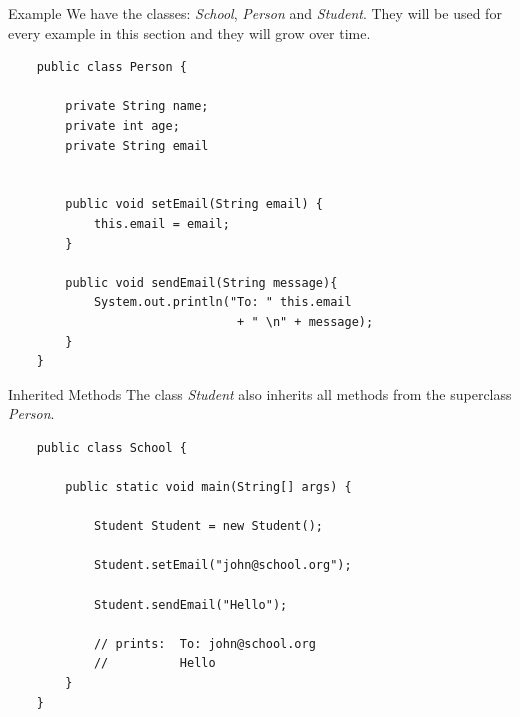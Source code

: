 \begin{frame}[fragile]{Example}
	We have the classes: \emph{School}, \emph{Person} and \emph{Student}.
	They will be used for every example in this section and they will grow over time.
	\begin{lstlisting}
	public class Person {
	
	    private String name;
	    private int age;
	    private String email
	    
    
	    public void setEmail(String email) {
	    	this.email = email;    
	    }
    
    	public void sendEmail(String message){
    		System.out.println("To: " this.email 
    							+ " \n" + message);
    	}
	}
	\end{lstlisting}
\end{frame}

\begin{frame}[fragile]{Inherited Methods}
	The class \emph{Student} also inherits all methods from the superclass \emph{Person}.
	\begin{lstlisting}
	public class School {
	
	    public static void main(String[] args) {
	    
	        Student Student = new Student();
	        
	        Student.setEmail("john@school.org");
	        
	        Student.sendEmail("Hello");
	        
	        // prints: 	To: john@school.org
	        //			Hello
	    }	
	}
	\end{lstlisting}
\end{frame}

